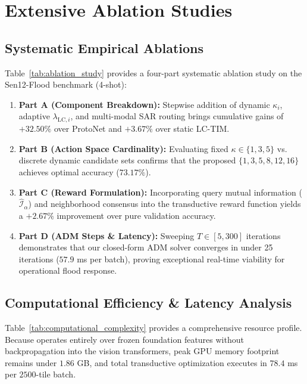 \section{Extensive Ablation Studies}
\label{sec:ablations}



\subsection{Systematic Empirical Ablations}
Table~\ref{tab:ablation_study} provides a four-part systematic ablation study on the Sen12-Flood benchmark (4-shot):
\begin{enumerate}
    \item \textbf{Part A (Component Breakdown):} Stepwise addition of dynamic $\kappa_i$, adaptive $\lambda_{\text{LC}, i}$, and multi-modal SAR routing brings cumulative gains of $+32.50\%$ over ProtoNet and $+3.67\%$ over static LC-TIM.
    \item \textbf{Part B (Action Space Cardinality):} Evaluating fixed $\kappa \in \{1, 3, 5\}$ vs. discrete dynamic candidate sets confirms that the proposed $\{1, 3, 5, 8, 12, 16\}$ achieves optimal accuracy ($73.17\%$).
    \item \textbf{Part C (Reward Formulation):} Incorporating query mutual information ($\hat{\mathcal{I}}_\alpha$) and neighborhood consensus into the transductive reward function yields a $+2.67\%$ improvement over pure validation accuracy.
    \item \textbf{Part D (ADM Steps \& Latency):} Sweeping $T \in [5, 300]$ iterations demonstrates that our closed-form ADM solver converges in under 25 iterations ($57.9$ ms per batch), proving exceptional real-time viability for operational flood response.
\end{enumerate}



\subsection{Computational Efficiency \& Latency Analysis}
Table~\ref{tab:computational_complexity} provides a comprehensive resource profile. Because \rllctim{} operates entirely over frozen foundation features without backpropagation into the vision transformers, peak GPU memory footprint remains under $1.86$ GB, and total transductive optimization executes in $78.4$ ms per $2500$-tile batch.

